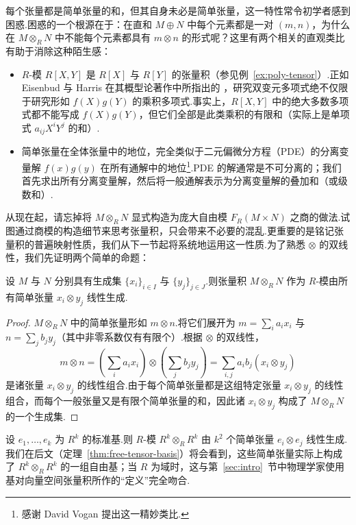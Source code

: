 每个张量都是简单张量的和，但其自身未必是简单张量，这一特性常令初学者感到困惑.困惑的一个根源在于：在直和 $M \oplus N$ 中每个元素都是一对 $(m, n)$，为什么在 $M \otimes_R N$ 中不能每个元素都具有 $m \otimes n$ 的形式呢？这里有两个相关的直观类比有助于消除这种陌生感：
\begin{itemize}
  \item $R$-模 $R[X, Y]$ 是 $R[X]$ 与 $R[Y]$ 的张量积（参见例~\ref{ex:poly-tensor}）.正如 Eisenbud 与 Harris 在其概型论著作中所指出的 \cite[第~39~页]{eisenbud-harris}，研究双变元多项式绝不仅限于研究形如 $f(X)g(Y)$ 的乘积多项式.事实上，$R[X, Y]$ 中的绝大多数多项式都不能写成 $f(X)g(Y)$，但它们全部是此类乘积的有限和（实际上是单项式 $a_{ij} X^i Y^j$ 的和）.
  \item 简单张量在全体张量中的地位，完全类似于二元偏微分方程（PDE）的分离变量解 $f(x)g(y)$ 在所有通解中的地位\footnote{感谢 David Vogan 提出这一精妙类比.}.PDE 的解通常是不可分离的；我们首先求出所有分离变量解，然后将一般通解表示为分离变量解的叠加和（或级数和）.
\end{itemize}

从现在起，请忘掉将 $M \otimes_R N$ 显式构造为庞大自由模 $F_R(M \times N)$ 之商的做法.试图通过商模的构造细节来思考张量积，只会带来不必要的混乱.更重要的是铭记张量积的普遍映射性质，我们从下一节起将系统地运用这一性质.为了熟悉 $\otimes$ 的双线性，我们先证明两个简单的命题：

\begin{theorem}\label{thm:spanning-tensor}
设 $M$ 与 $N$ 分别具有生成集 $\{x_i\}_{i \in I}$ 与 $\{y_j\}_{j \in J}$.则张量积 $M \otimes_R N$ 作为 $R$-模由所有简单张量 $x_i \otimes y_j$ 线性生成.
\end{theorem}

\begin{proof}
$M \otimes_R N$ 中的简单张量形如 $m \otimes n$.将它们展开为 $m = \sum_i a_i x_i$ 与 $n = \sum_j b_j y_j$（其中非零系数仅有有限个）.根据 $\otimes$ 的双线性，
\[
  m \otimes n = \left(\sum_i a_i x_i\right) \otimes \left(\sum_j b_j y_j\right) = \sum_{i, j} a_i b_j (x_i \otimes y_j)
\]
是诸张量 $x_i \otimes y_j$ 的线性组合.由于每个简单张量都是这组特定张量 $x_i \otimes y_j$ 的线性组合，而每个一般张量又是有限个简单张量的和，因此诸 $x_i \otimes y_j$ 构成了 $M \otimes_R N$ 的一个生成集.
\end{proof}

\begin{example}\label{ex:rk-tensor}
设 $e_1, \dots, e_k$ 为 $R^k$ 的标准基.则 $R$-模 $R^k \otimes_R R^k$ 由 $k^2$ 个简单张量 $e_i \otimes e_j$ 线性生成.我们在后文（定理~\ref{thm:free-tensor-basis}）将会看到，这些简单张量实际上构成了 $R^k \otimes_R R^k$ 的一组自由基；当 $R$ 为域时，这与第~\ref{sec:intro}~节中物理学家使用基对向量空间张量积所作的``定义''完全吻合.
\end{example}

